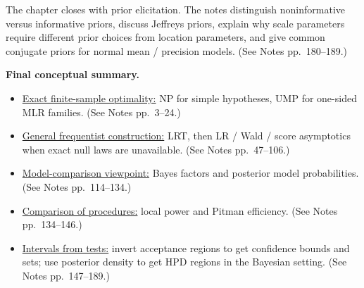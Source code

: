 The chapter closes with prior elicitation. The notes distinguish noninformative versus informative priors, discuss Jeffreys priors, explain why scale parameters require different prior choices from location parameters, and give common conjugate priors for normal mean / precision models. (See Notes pp.~180--189.)

\begin{mybox}
\textbf{Final conceptual summary.}
\begin{itemize}
    \item \underline{Exact finite-sample optimality:} NP for simple hypotheses, UMP for one-sided MLR families. (See Notes pp.~3--24.)
    \item \underline{General frequentist construction:} LRT, then LR / Wald / score asymptotics when exact null laws are unavailable. (See Notes pp.~47--106.)
    \item \underline{Model-comparison viewpoint:} Bayes factors and posterior model probabilities. (See Notes pp.~114--134.)
    \item \underline{Comparison of procedures:} local power and Pitman efficiency. (See Notes pp.~134--146.)
    \item \underline{Intervals from tests:} invert acceptance regions to get confidence bounds and sets; use posterior density to get HPD regions in the Bayesian setting. (See Notes pp.~147--189.)
\end{itemize}
\end{mybox}
